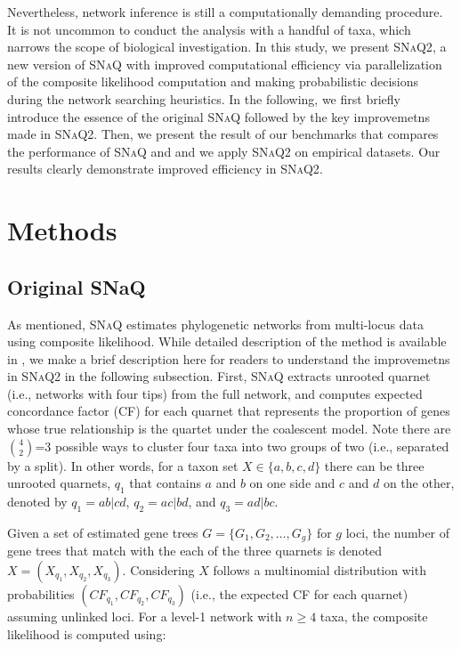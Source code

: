 \documentclass[unnumsec,webpdf,contemporary,large]{oup-authoring-template}%
\theoremstyle{thmstyleone}%
\theoremstyle{thmstyletwo}%
\theoremstyle{thmstylethree}%
\begin{document}
Nevertheless, network inference is still a computationally demanding procedure. It is not uncommon to conduct the analysis with a handful of taxa, which narrows the scope of biological investigation. In this study, we present \textsc{SNaQ2}, a new version of \textsc{SNaQ} with improved computational efficiency via parallelization of the composite likelihood computation and making probabilistic decisions during the network searching heuristics. In the following, we first briefly introduce the essence of the original \textsc{SNaQ} followed by the key improvemetns made in \textsc{SNaQ2}. Then, we present the result of our benchmarks that compares the performance of \textsc{SNaQ} and  and we apply \textsc{SNaQ2} on empirical datasets. Our results clearly demonstrate improved efficiency in \textsc{SNaQ2}.

\section{Methods}\label{sec2}
\subsection{Original SNaQ}\label{subsec1}
As mentioned, \textsc{SNaQ} estimates phylogenetic networks from multi-locus data using composite likelihood. While detailed description of the method is available in \cite{solis-lemus2016}, we make a brief description here for readers to understand the improvemetns in \textsc{SNaQ2} in the following subsection. First, \textsc{SNaQ} extracts unrooted quarnet (i.e., networks with four tips) from the full network, and computes expected concordance factor (CF) for each quarnet that represents the proportion of genes whose true relationship is the quartet under the coalescent model. Note there are $4 \choose 2$=3 possible ways to cluster four taxa into two groups of two (i.e., separated by a split). In other words, for a taxon set $X\in\{a,b,c,d\}$ there can be three unrooted quarnets, $q_1$ that contains $a$ and $b$ on one side and $c$ and $d$ on the other, denoted by $q_1=ab|cd$, $q_2=ac|bd$, and $q_3=ad|bc$.

Given a set of estimated gene trees $G=\{G_1,G_2,\dots,G_g\}$ for $g$ loci, the number of gene trees that match with the each of the three quarnets is denoted $X=(X_{q_1},X_{q_2},X_{q_3})$. Considering $X$ follows a multinomial distribution with probabilities $(CF_{q_1},CF_{q_2},CF_{q_3})$ (i.e., the expected CF for each quarnet) assuming unlinked loci. For a level-1 network with $n\ge4$ taxa, the composite likelihood is computed using:
\end{document}
